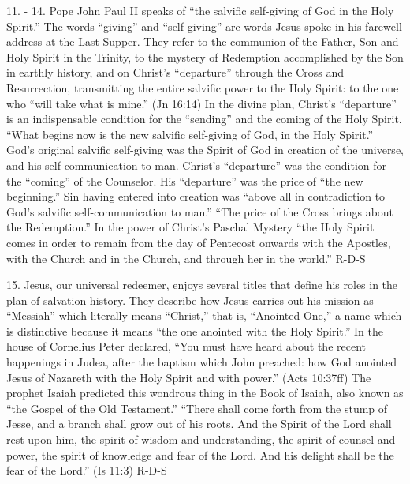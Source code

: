 \documentclass[oneside]{book}
\begin{document}
11. - 14. Pope John Paul II speaks of ``the salvific self-giving of God in the
Holy Spirit.'' The words ``giving'' and ``self-giving'' are words Jesus spoke in
his farewell address at the Last Supper. They refer to the communion of the
Father, Son and Holy Spirit in the Trinity, to the mystery of Redemption
accomplished by the Son in earthly history, and on Christ's ``departure''
through the Cross and Resurrection, transmitting the entire salvific power to
the Holy Spirit: to the one who ``will take what is mine.'' (Jn 16:14) In the
divine plan, Christ's ``departure'' is an indispensable condition for the
``sending'' and the coming of the Holy Spirit. ``What begins now is the new
salvific self-giving of God, in the Holy Spirit.'' God's original salvific
self-giving was the Spirit of God in creation of the universe, and his
self-communication to man. Christ's ``departure'' was the condition for the
``coming'' of the Counselor. His ``departure'' was the price of ``the new
beginning.'' Sin having entered into creation was ``above all in contradiction
to God's salvific self-communication to man.'' ``The price of the Cross brings
about the Redemption.'' In the power of Christ's Paschal Mystery ``the Holy
Spirit comes in order to remain from the day of Pentecost onwards with the
Apostles, with the Church and in the Church, and through her in the world.''
R-D-S

15. Jesus, our universal redeemer, enjoys several titles that define his roles
in the plan of salvation history. They describe how Jesus carries out his
mission as ``Messiah'' which literally means ``Christ,'' that is, ``Anointed
One,'' a name which is distinctive because it means ``the one anointed with the
Holy Spirit.'' In the house of Cornelius Peter declared, ``You must have heard
about the recent happenings in Judea, after the baptism which John preached: how
God anointed Jesus of Nazareth with the Holy Spirit and with power.'' (Acts
10:37ff) The prophet Isaiah predicted this wondrous thing in the Book of Isaiah,
also known as ``the Gospel of the Old Testament.'' ``There shall come forth from
the stump of Jesse, and a branch shall grow out of his roots. And the Spirit of
the Lord shall rest upon him, the spirit of wisdom and understanding, the spirit
of counsel and power, the spirit of knowledge and fear of the Lord. And his
delight shall be the fear of the Lord.'' (Is 11:3)
R-D-S
\end{document}
